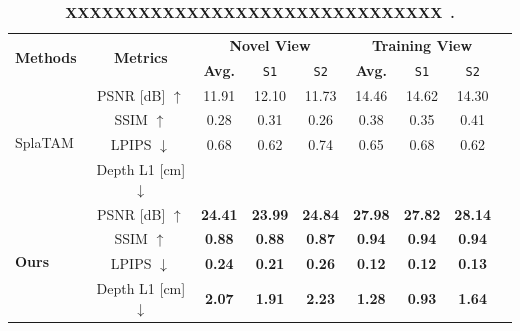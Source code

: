 \documentclass{article}
\newcommand{\redx}{{\color{red}\ding{55}}}
\begin{document}
\begin{table}[t]
\centering

\scriptsize
\setlength{\tabcolsep}{3.5pt}

\begin{tabular}{lcccccccc}
\toprule

\multirow{2}{*}{\textbf{Methods}} & \multirow{2}{*}{\textbf{Metrics}} & \multicolumn{3}{c}{\textbf{Novel View}} & \multicolumn{3}{c}{\textbf{Training View}} \\





 &  & \textbf{Avg.} & \texttt{S1} & \texttt{S2} & \textbf{Avg.} & \texttt{S1} & \texttt{S2} \\


\midrule

\multirow{4}{*}{SplaTAM~\cite{}} & PSNR [dB] $\uparrow$ & \cellcolor{tabsecond}11.91 & \cellcolor{tabsecond}12.10 & \cellcolor{tabsecond}11.73 & \cellcolor{tabsecond}14.46 & \cellcolor{tabsecond}14.62 & \cellcolor{tabsecond}14.30 \\
& SSIM $\uparrow$  & \cellcolor{tabsecond}0.28 & \cellcolor{tabsecond}0.31 & \cellcolor{tabsecond}0.26 & \cellcolor{tabsecond}0.38 & \cellcolor{tabsecond}0.35 & \cellcolor{tabsecond}0.41 \\
& LPIPS $\downarrow$ & \cellcolor{tabsecond}0.68 & \cellcolor{tabsecond}0.62 & \cellcolor{tabsecond}0.74  & \cellcolor{tabsecond}0.65 & \cellcolor{tabsecond}0.68 & \cellcolor{tabsecond}0.62 \\
& Depth L1 [cm] $\downarrow$ & \cellcolor{tabsecond}\redx & \cellcolor{tabsecond}\redx & \cellcolor{tabsecond}\redx & \cellcolor{tabsecond}\redx & \cellcolor{tabsecond}\redx & \cellcolor{tabsecond}\redx \\


\multirow{4}{*}{\textbf{{Ours}}} & PSNR [dB] $\uparrow$ & \cellcolor{tabfirst}\textbf{24.41} & \cellcolor{tabfirst}\textbf{23.99} & \cellcolor{tabfirst}\textbf{24.84} & \cellcolor{tabfirst}\textbf{27.98} & \cellcolor{tabfirst}\textbf{27.82} & \cellcolor{tabfirst}\textbf{28.14} \\
& SSIM $\uparrow$  & \cellcolor{tabfirst}\textbf{0.88} & \cellcolor{tabfirst}\textbf{0.88} & \cellcolor{tabfirst}\textbf{0.87} & \cellcolor{tabfirst}\textbf{0.94} & \cellcolor{tabfirst}\textbf{0.94} & \cellcolor{tabfirst}\textbf{0.94} \\
& LPIPS $\downarrow$ & \cellcolor{tabfirst}\textbf{0.24} & \cellcolor{tabfirst}\textbf{0.21} & \cellcolor{tabfirst}\textbf{0.26} & \cellcolor{tabfirst}\textbf{0.12} & \cellcolor{tabfirst}\textbf{0.12} & \cellcolor{tabfirst}\textbf{0.13} \\
& Depth L1 [cm] $\downarrow$ & \cellcolor{tabfirst}\textbf{2.07} & \cellcolor{tabfirst}\textbf{1.91} & \cellcolor{tabfirst}\textbf{2.23} & \cellcolor{tabfirst}\textbf{1.28} & \cellcolor{tabfirst}\textbf{0.93} & \cellcolor{tabfirst}\textbf{1.64} \\

\bottomrule
\end{tabular}
\caption{\textbf{XXXXXXXXXXXXXXXXXXXXXXXXXXXXXXX~\cite{}.} }
\label{tab:xxxxxx}
\end{table}
\end{document}
